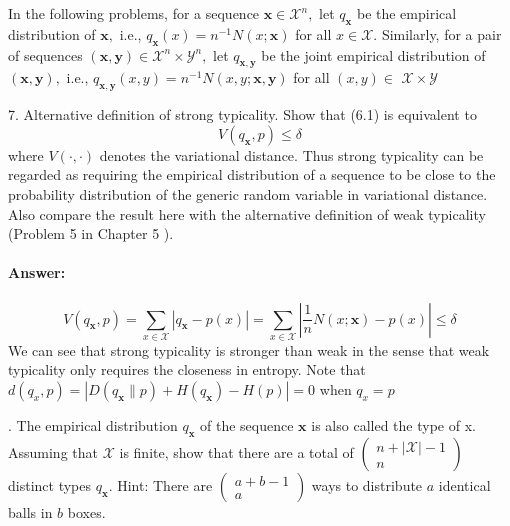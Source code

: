 \documentclass[8pt]{article}
\begin{document}
\vspace{10pt}
In the following problems, for a sequence $\mathbf{x} \in \mathcal{X}^{n},$ let $q_{\mathbf{x}}$ be the empirical distribution of $\mathbf{x},$ i.e., $q_{\mathbf{x}}(x)=n^{-1} N(x ; \mathbf{x})$ for all $x \in \mathcal{X}$. Similarly, for a pair of sequences $(\mathbf{x}, \mathbf{y}) \in \mathcal{X}^{n} \times \mathcal{Y}^{n},$ let $q_{\mathbf{x}, \mathbf{y}}$ be the joint empirical distribution of $(\mathbf{x}, \mathbf{y}),$ i.e., $q_{\mathbf{x}, \mathbf{y}}(x, y)=n^{-1} N(x, y ; \mathbf{x}, \mathbf{y})$ for all $(x, y) \in$
$\mathcal{X} \times \mathcal{Y}$\\
\begin{tcolorbox}
7. Alternative definition of strong typicality. Show that (6.1) is equivalent to
$$
V\left(q_{\mathbf{x}}, p\right) \leq \delta
$$
where $V(\cdot, \cdot)$ denotes the variational distance. Thus strong typicality can be regarded as requiring the empirical distribution of a sequence to be close to the probability distribution of the generic random variable in variational distance. Also compare the result here with the alternative definition of weak typicality (Problem 5 in Chapter 5 ).
\end{tcolorbox}
\paragraph{Answer:}
$$
V\left(q_{\mathbf{x}}, p\right)=
\sum_{x \in \mathcal{X}}\left| q_{\mathbf{x}} -p(x)\right| = 
\sum_{x \in \mathcal{X}}\left|\frac{1}{n} N(x ; \mathbf{x})-p(x)\right|  \leq \delta
$$
We can see that strong typicality is stronger than weak in the sense that weak typicality only requires the closeness in entropy. Note that $ d(q_x, p) = 
\left|D\left(q_{\mathbf{x}} \| p\right)+H\left(q_{\mathbf{x}}\right)-H(p)\right| = 0 
$ when $q_x = p$ \\
\begin{tcolorbox}
. The empirical distribution $q_{\mathbf{x}}$ of the sequence $\mathbf{x}$ is also called the type of
x. Assuming that $\mathcal{X}$ is finite, show that there are a total of $\left(\begin{array}{c}n+|\mathcal{X}|-1 \\ n\end{array}\right)$ distinct types $q_{\mathbf{x}} .$ Hint: There are $\left(\begin{array}{c}a+b-1 \\ a\end{array}\right)$ ways to distribute $a$ identical balls in $b$ boxes.
\end{tcolorbox}
\end{document}
